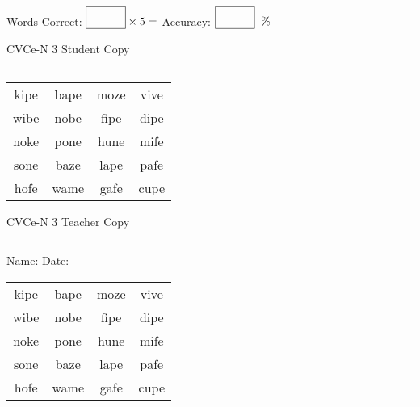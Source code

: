 \documentclass{memoir}
\begin{document}
\small

Words Correct: $\fbox{\phantom{\huge 100}} \times 5 = $ Accuracy: $\fbox{\phantom{\huge 100}}\;\; \%$ 

\vfill

\newpage


\footnotesize \noindent
CVCe-N 3 \hfill Student Copy
\smallskip
\hrule

\Large

\setlength{\tabcolsep}{14pt}
\def\arraystretch{2}

{\selectfont


\begin{vplace}[0.5]
\begin{center}
\begin{tabular}{cccc}
kipe & bape & moze & vive \\
wibe & nobe & fipe & dipe \\
noke & pone & hune & mife \\
sone & baze & lape & pafe \\
hofe & wame & gafe & cupe \\
\end{tabular}
\end{center}
\end{vplace}

}

\newpage

\footnotesize \noindent
CVCe-N 3 \hfill Teacher Copy
\smallskip
\hrule

\small

\vfill

\noindent
Name: \underline{\hspace{1.75in}} \hfill Date: \underline{\hspace{1in}}

\Large

{\selectfont


\begin{vplace}[0.5]
\begin{center}
\begin{tabular}{cccc}
kipe & bape & moze & vive \\
wibe & nobe & fipe & dipe \\
noke & pone & hune & mife \\
sone & baze & lape & pafe \\
hofe & wame & gafe & cupe \\
\end{tabular}
\end{center}
\end{vplace}



}
\end{document}
